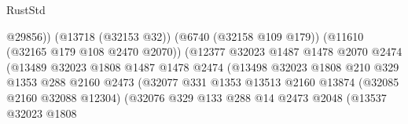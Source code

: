 \begin{lexlean}{RustStd}
\begin{coremodule}
                                                    @29856))
                                                (@13718 (@32153 @32))
                                                (@6740 (@32158 @109 @179))
                                                (@11610 (@32165 @179 @108 @2470 @2070))
                                                (@12377
                                                  @32023
                                                  @1487
                                                  @1478
                                                  @2070
                                                  @2474
                                                  (@13489
                                                    @32023
                                                    @1808
                                                    @1487
                                                    @1478
                                                    @2474
                                                    (@13498
                                                      @32023
                                                      @1808
                                                      @210
                                                      @329
                                                      @1353
                                                      @288
                                                      @2160
                                                      @2473
                                                      (@32077
                                                        @331
                                                        @1353
                                                        @13513
                                                        @2160
                                                        @13874
                                                        (@32085 @2160 @32088 @12304)
                                                        (@32076
                                                          @329
                                                          @133
                                                          @288
                                                          @14
                                                          @2473
                                                          @2048
                                                          (@13537
                                                            @32023
                                                            @1808

\end{coremodule}
\end{lexlean}
